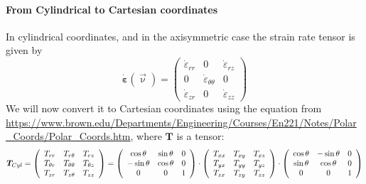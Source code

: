 \paragraph{From Cylindrical to Cartesian coordinates}

In cylindrical coordinates, and in the axisymmetric case
the strain rate tensor is given by
\[
\dot{\bm\varepsilon}(\vec\upnu)
=
\left(
\begin{array}{ccc}
\dot\varepsilon_{rr} & 0 & \dot{\varepsilon}_{rz} \\
0 & \dot{\varepsilon}_{\theta\theta}  & 0 \\
\dot{\varepsilon}_{zr} & 0 & \dot\varepsilon_{zz}
\end{array}
\right)
\]
We will now convert it to Cartesian coordinates using the equation from \url{https://www.brown.edu/Departments/Engineering/Courses/En221/Notes/Polar_Coords/Polar_Coords.htm}, where ${\bm T}$ is a tensor:
\[
{\bm T}_{\tiny Cyl}=
\left(
\begin{array}{ccc}
T_{rr}       & T_{r\theta}      & T_{rz} \\
T_{\theta r} & T_{\theta\theta} & T_{\theta z} \\
T_{z r}      & T_{z \theta}     & T_{zz}
\end{array}
\right)
=
\left(
\begin{array}{ccc}
 \cos \theta&\sin \theta&0 \\
-\sin \theta&\cos \theta&0 \\
0 & 0 & 1 
\end{array}
\right)
\cdot
\left(
\begin{array}{ccc}
T_{xx} & T_{xy} & T_{xz} \\
T_{yx} & T_{yy} & T_{yz} \\
T_{zx} & T_{zy} & T_{zz} 
\end{array}
\right)
\cdot
\left(
\begin{array}{ccc}
\cos \theta & -\sin \theta&0 \\
\sin \theta &  \cos \theta&0 \\
0 & 0 & 1 
\end{array}
\right)
\]

